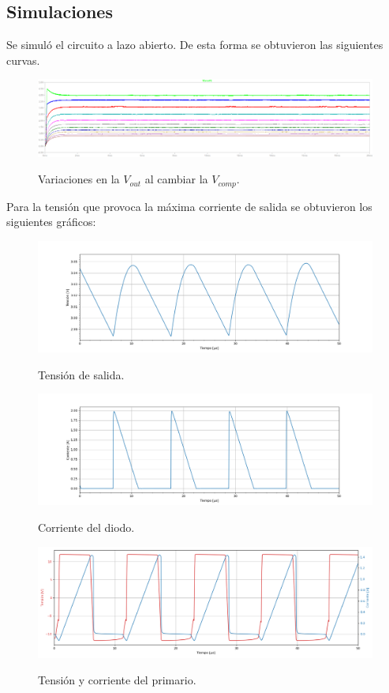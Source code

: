 \subsection{Simulaciones}
Se simuló el circuito a lazo abierto. De esta forma se obtuvieron las siguientes curvas.
\begin{figure}[H]
	\centering
	\includegraphics[width=0.9\linewidth]{ImagenesParteII/vos.png}
	\label{fig:vos}
	\caption{Variaciones en la $V_{out}$ al cambiar la $V_{comp}$.}
\end{figure}

Para la tensión que provoca la máxima corriente de salida se obtuvieron los siguientes gráficos:
\begin{figure}[H]
	\centering
	\includegraphics[width=\linewidth]{ImagenesParteII/ Vo.png}
	\label{fig:vo}
	\caption{Tensión de salida.}
\end{figure}

\begin{figure}[H]
	\centering
	\includegraphics[width=\linewidth]{ImagenesParteII/Idiodo.png}
	\label{fig:idiodo}
	\caption{Corriente del diodo.}
\end{figure}

\begin{figure}[H]
	\centering
	\includegraphics[width=0.9\linewidth]{ImagenesParteII/Primario.png}
	\label{fig:primario}
	\caption{Tensión y corriente del primario.}
\end{figure}

